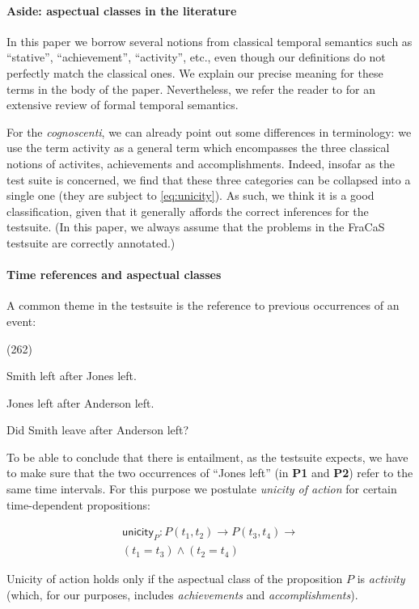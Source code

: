 \documentclass[a4paper,twoside]{article}
\newcommand\hyp{\item[H]}
\newcommand\fracasex[2]{\begin{lingex}\item[(#1)] \begin{subex} #2 \end{subex} \end{lingex} }
\newcommand\constant[1]{\mathsf{#1}}
\begin{document}
\paragraph{Aside: aspectual classes in the literature}
In this paper we borrow several notions from classical temporal
semantics such as ``stative'', ``achievement'', ``activity'', etc.,
even though our definitions do not perfectly match the classical
ones. We explain our precise meaning for these terms in the body of the
paper. Nevertheless, we refer the reader to \citet{steedman:2000} for
an extensive review of formal temporal semantics.

For the \textit{cognoscenti}, we can already point out some
differences in terminology: we use the term activity as a general term
which encompasses the three classical notions of activites,
achievements and accomplishments. Indeed, insofar as the test suite is
concerned, we find that these three categories can be collapsed into a
single one (they are subject to \cref{eq:unicity}).  As such, we think
it is a good classification, given that it generally affords the
correct inferences for the testsuite. (In this paper, we always assume
that the problems in the FraCaS testsuite are correctly annotated.)

\paragraph{Time references and aspectual classes}

A common theme in the testsuite is the reference to previous
occurrences of an event:

\fracasex{262}{
\item	Smith left after Jones left.
\item	Jones left after Anderson left.
\hyp 	Did Smith leave after Anderson left?
}

To be able to conclude that there is entailment, as the testsuite expects, we have to make sure
that the two occurrences of ``Jones left'' (in \textbf{P1} and \textbf{P2}) refer to the
same time intervals.
%
For this purpose we postulate \emph{unicity of action} for certain time-dependent
propositions:

\begin{multline}
  \constant{unicity}_P : P (t_1,t_2) → P (t_3,t_4) → \\ (t_1 = t_3) ∧ (t_2 = t_4)
  \label{eq:unicity}
\end{multline}

Unicity of action holds only if the aspectual class of the proposition
$P$ is \emph{activity}~\citep{steedman_productions_2000} (which, for our
purposes, includes \emph{achievements} and \emph{accomplishments}).
\end{document}
